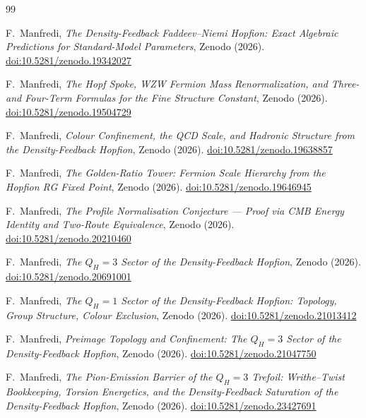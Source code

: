 \documentclass[11pt,a4paper]{article}
\theoremstyle{definition}\newtheorem{definition}[theorem]{Definition}
\theoremstyle{remark}
\theoremstyle{definition}\newtheorem{construction}[theorem]{Construction}
\begin{document}
\begin{thebibliography}{99}

F.~Manfredi,
\textit{The Density-Feedback Faddeev--Niemi Hopfion:
  Exact Algebraic Predictions for Standard-Model Parameters},
Zenodo (2026).
\href{https://doi.org/10.5281/zenodo.19342027}{doi:10.5281/zenodo.19342027}

F.~Manfredi,
\textit{The Hopf Spoke, WZW Fermion Mass Renormalization,
  and Three- and Four-Term Formulas for the Fine Structure Constant},
Zenodo (2026).
\href{https://doi.org/10.5281/zenodo.19504729}{doi:10.5281/zenodo.19504729}

F.~Manfredi,
\textit{Colour Confinement, the QCD Scale, and Hadronic Structure
  from the Density-Feedback Hopfion},
Zenodo (2026).
\href{https://doi.org/10.5281/zenodo.19638857}{doi:10.5281/zenodo.19638857}

F.~Manfredi,
\textit{The Golden-Ratio Tower: Fermion Scale Hierarchy from the Hopfion RG Fixed Point},
Zenodo (2026).
\href{https://doi.org/10.5281/zenodo.19646945}{doi:10.5281/zenodo.19646945}

F.~Manfredi,
\textit{The Profile Normalisation Conjecture ---
  Proof via CMB Energy Identity and Two-Route Equivalence},
Zenodo (2026).
\href{https://doi.org/10.5281/zenodo.20210460}{doi:10.5281/zenodo.20210460}

F.~Manfredi,
\textit{The $Q_H=3$ Sector of the Density-Feedback Hopfion},
Zenodo (2026).
\href{https://doi.org/10.5281/zenodo.20691001}{doi:10.5281/zenodo.20691001}

 F.~Manfredi,
\textit{The $Q_H=1$ Sector of the
Density-Feedback Hopfion: Topology, Group Structure, Colour Exclusion},
Zenodo (2026).
\href{https://doi.org/10.5281/zenodo.21013412}{doi:10.5281/zenodo.21013412}

 F.~Manfredi,
\textit{Preimage Topology and Confinement: The $Q_H=3$ Sector of the Density-Feedback Hopfion},
Zenodo (2026).
\href{https://doi.org/10.5281/zenodo.21047750}{doi:10.5281/zenodo.21047750}

 F.~Manfredi,
\textit{The Pion-Emission Barrier of the $Q_H=3$ Trefoil: Writhe--Twist Bookkeeping,
Torsion Energetics, and the Density-Feedback Saturation of the Density-Feedback Hopfion},
Zenodo (2026).
\href{https://doi.org/10.5281/zenodo.23427691}{doi:10.5281/zenodo.23427691}


\end{thebibliography}
\end{document}
